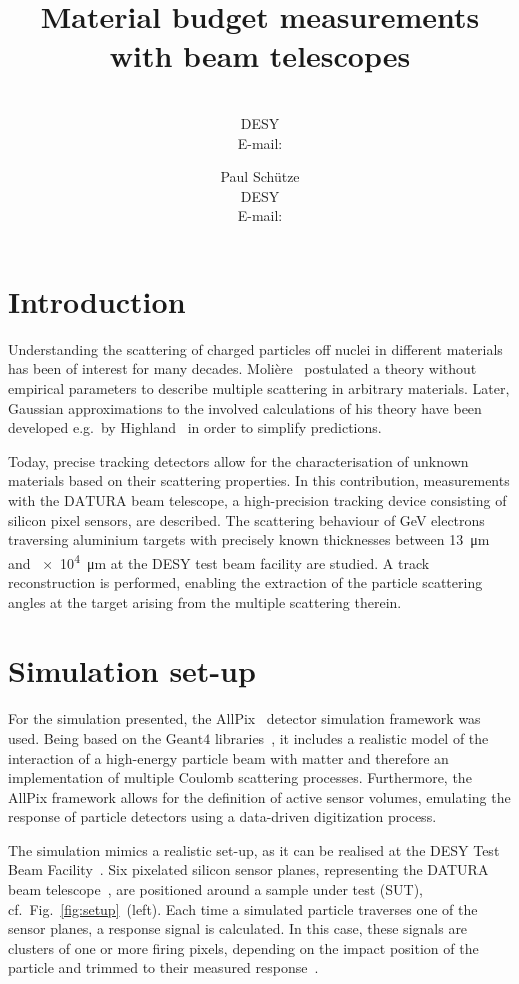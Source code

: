 \documentclass{PoS}
\title{Material budget measurements with beam telescopes}
\author{\speaker{Hendrik Jansen}\\
        DESY\\
        E-mail: \email{hendrik.jansen@desy.de}}
\author{Paul Sch\"utze\\
        DESY\\
        E-mail: \email{paul.schuetze@desy.de}}
\newcommand{\Datura}{\ensuremath{\textrm{DATURA}}}
\newcommand{\Geant}{\ensuremath{\textrm{Geant4}}}
\begin{document}
\linenumbers
\section{Introduction}
Understanding the scattering of charged particles off nuclei in different materials has been of interest for many decades. 
Moli\`ere~\cite{moliere} postulated a theory without empirical parameters to describe multiple scattering in arbitrary materials.
Later, Gaussian approximations to the involved calculations of his theory have been developed e.g.\ by Highland~\cite{ref:scatteringhighland} in order to simplify predictions.

Today, precise tracking detectors allow for the characterisation of unknown materials based on their scattering properties. %
In this contribution, measurements with the $\Datura$ beam telescope, a high-precision tracking device consisting of silicon pixel sensors, are described.
The scattering behaviour of GeV electrons traversing aluminium targets with precisely known thicknesses between \SI{13}{\um} and \SI{e4}{\um} at the DESY test beam facility are studied.
A track reconstruction is performed, enabling the extraction of the particle scattering angles at the target arising from the multiple scattering therein.


\section{Simulation set-up}
For the simulation presented, the AllPix~\cite{ref:AllPix} detector simulation framework was used. 
Being based on the $\Geant$ libraries~\cite{ref:Geant4}, it includes a realistic model of the interaction of a high-energy particle beam with matter
 and therefore an implementation of multiple Coulomb scattering processes.
Furthermore, the AllPix framework allows for the definition of active sensor volumes,
 emulating the response of particle detectors using a data-driven digitization process. 

The simulation mimics a realistic set-up, as it can be realised at the DESY Test Beam Facility~\cite{ref:DESYtb}. 
Six pixelated  silicon sensor planes, representing the DATURA beam telescope~\cite{JansenEPJ}, are positioned around a sample under test (SUT), cf.\ Fig.~\ref{fig:setup}~(left). 
Each time a simulated particle traverses one of the 
sensor planes, a response signal is calculated. In this case, these signals are clusters of one or more firing pixels, depending on the impact position of the particle and trimmed to their measured response~\cite{ref:datura-inpixel}.
\end{document}
